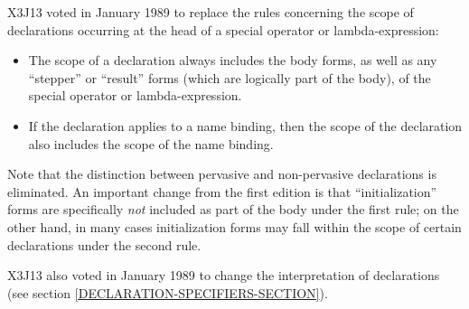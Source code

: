 \begin{defspec}
\begin{new}
X3J13 voted in January 1989
to replace the rules concerning the scope of
declarations occurring at the head of a special operator or lambda-expression:
\begin{itemize}
\item The scope of a declaration always includes the body forms, as well as any
``stepper'' or ``result'' forms (which are logically part of the body), of the
special operator or lambda-expression.

\item If the declaration applies to a name binding, then the scope of the
declaration also includes the scope of the name binding.
\end{itemize}
Note that
the distinction between pervasive and non-pervasive
declarations is eliminated.  An important change
from the first edition is that ``initialization''
forms are specifically \emph{not} included as part of the body under the first
rule; on the other hand, in many cases initialization forms may fall
within the scope of certain declarations under the second rule.
\end{new}

\begin{new}
X3J13 also voted in January 1989
to change the interpretation
of  declarations (see section \ref{DECLARATION-SPECIFIERS-SECTION}).
\end{new}


\end{defspec}
